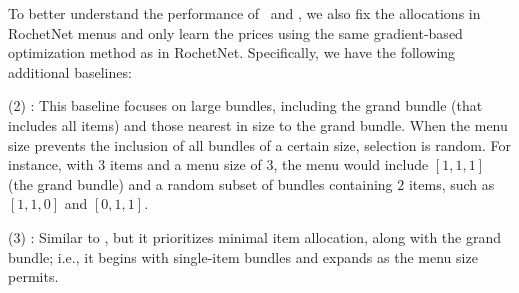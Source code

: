 To better understand the performance of \name~and \bundle, we also fix the allocations in RochetNet menus and only learn the prices using the same gradient-based optimization method as in RochetNet. Specifically, we have the following additional baselines:

(2) \textbf{\bigbundle}: This baseline focuses on large bundles, including the grand bundle (that includes all items) and those nearest in size to the grand bundle. When the menu size prevents the inclusion of all bundles of a certain size, selection is random. %
For instance, with 3 items and a menu size of 3, the menu would include $[1,1,1]$ (the grand bundle) and a random subset of bundles containing $2$ items, such as $[1,1,0]$ and $[0,1,1]$.

(3) \textbf{\smallbundle}: Similar to \bigbundle, but it prioritizes minimal item allocation, along with the grand bundle; i.e., it begins with single-item bundles and expands as the menu size permits.

